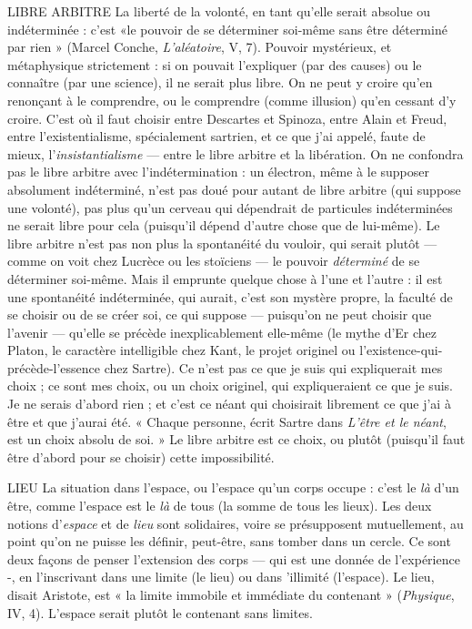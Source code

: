 {LIBRE ARBITRE La liberté de la volonté, en tant qu’elle serait absolue ou
indéterminée : c’est «le pouvoir de se déterminer soi-même
sans être déterminé par rien » (Marcel Conche, {\it L'aléatoire}, V, 7). Pouvoir
mystérieux, et métaphysique strictement : si on pouvait l’expliquer (par
des causes) ou le connaître (par une science), il ne serait plus libre. On ne peut
y croire qu’en renonçant à le comprendre, ou le comprendre (comme illusion)
qu'en cessant d’y croire. C’est où il faut choisir entre Descartes et Spinoza,
entre Alain et Freud, entre l’existentialisme, spécialement sartrien, et ce que j’ai
appelé, faute de mieux, l’{\it insistantialisme} — entre le libre arbitre et la libération.
On ne confondra pas le libre arbitre avec l’indétermination : un électron,
même à le supposer absolument indéterminé, n’est pas doué pour autant de
libre arbitre (qui suppose une volonté), pas plus qu’un cerveau qui dépendrait
de particules indéterminées ne serait libre pour cela (puisqu'il dépend d’autre
chose que de lui-même). Le libre arbitre n’est pas non plus la spontanéité du
vouloir, qui serait plutôt — comme on voit chez Lucrèce ou les stoïciens — le
pouvoir {\it déterminé} de se déterminer soi-même. Mais il emprunte quelque chose
à l’une et l’autre : il est une spontanéité indéterminée, qui aurait, c’est son mystère
propre, la faculté de se choisir ou de se créer soi, ce qui suppose —
puisqu'on ne peut choisir que l'avenir — qu’elle se précède inexplicablement
elle-même (le mythe d’Er chez Platon, le caractère intelligible chez Kant, le
projet originel ou l’existence-qui-précède-l’essence chez Sartre). Ce n’est pas ce
que je suis qui expliquerait mes choix ; ce sont mes choix, ou un choix originel,
qui expliqueraient ce que je suis. Je ne serais d’abord rien ; et c’est ce néant qui
choisirait librement ce que j'ai à être et que j’aurai été. « Chaque personne, écrit
Sartre dans {\it L'être et le néant}, est un choix absolu de soi. » Le libre arbitre est ce
choix, ou plutôt (puisqu'il faut être d’abord pour se choisir) cette impossibilité.

LIEU La situation dans l’espace, ou l’espace qu’un corps occupe : c’est le {\it là}
d’un être, comme l’espace est le {\it là} de tous (la somme de tous les
lieux). Les deux notions d’{\it espace} et de {\it lieu} sont solidaires, voire se présupposent
mutuellement, au point qu’on ne puisse les définir, peut-être, sans tomber dans
un cercle. Ce sont deux façons de penser l’extension des corps — qui est une
donnée de l'expérience -, en l’inscrivant dans une limite (le lieu) ou dans 'illimité
(l’espace). Le lieu, disait Aristote, est « la limite immobile et immédiate du
contenant » ({\it Physique}, IV, 4). L'espace serait plutôt le contenant sans limites.

}
